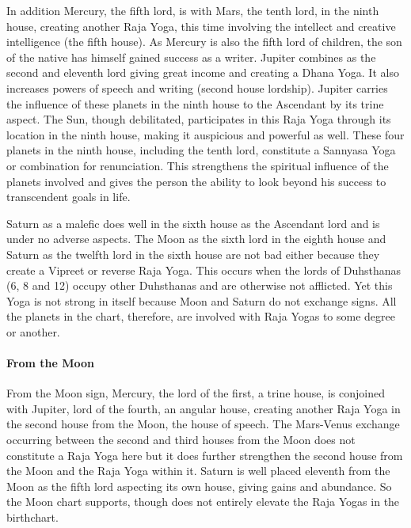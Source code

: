 In addition Mercury, the fifth lord, is with Mars, the tenth lord, in the ninth house, creating another Raja Yoga, this time involving the intellect and creative intelligence (the fifth house). As Mercury is also the fifth lord of children, the son of the native has himself gained success as a writer. Jupiter combines as the second and eleventh lord giving great income and creating a Dhana Yoga. It also increases powers of speech and writing (second house lordship). Jupiter carries the influence of these planets in the ninth house to the Ascendant by its trine aspect. The Sun, though debilitated, participates in this Raja Yoga through its location in the ninth house, making it auspicious and powerful as well. These four planets in the ninth house, including the tenth lord, constitute a Sannyasa Yoga or combination for renunciation. This strengthens the spiritual influence of the planets involved and gives the person the ability to look beyond his success to transcendent goals in life.

 

Saturn as a malefic does well in the sixth house as the Ascendant lord and is under no adverse aspects. The Moon as the sixth lord in the eighth house and Saturn as the twelfth lord in the sixth house are not bad either because they create a Vipreet or reverse Raja Yoga. This occurs when the lords of Duhsthanas (6, 8 and 12) occupy other Duhsthanas and are otherwise not afflicted. Yet this Yoga is not strong in itself because Moon and Saturn do not exchange signs. All the planets in the chart, therefore, are involved with Raja Yogas to some degree or another.

 

\paragraph{From the Moon}

From the Moon sign, Mercury, the lord of the first, a trine house, is conjoined with Jupiter, lord of the fourth, an angular house, creating another Raja Yoga in the second house from the Moon, the house of speech. The Mars-Venus exchange occurring between the second and third houses from the Moon does not constitute a Raja Yoga here but it does further strengthen the second house from the Moon and the Raja Yoga within it. Saturn is well placed eleventh from the Moon as the fifth lord aspecting its own house, giving gains and abundance. So the Moon chart supports, though does not entirely elevate the Raja Yogas in the birthchart.

